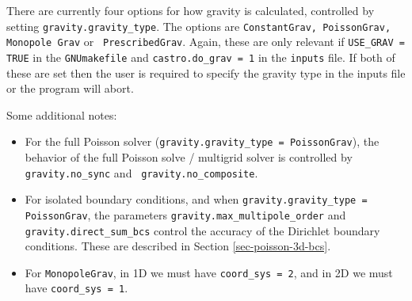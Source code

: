 There are currently four options for how gravity is calculated,
controlled by setting {\tt gravity.gravity\_type}.  The options are
{\tt ConstantGrav, PoissonGrav, Monopole Grav} or {\tt
  PrescribedGrav}.  Again, these are only relevant if {\tt USE\_GRAV =
  TRUE} in the {\tt GNUmakefile} and {\tt castro.do\_grav = 1} in the
{\tt inputs} file.  If both of these are set then the user is required
to specify the gravity type in the inputs file or the program will
abort.

Some additional notes:
\begin{itemize}

\item For the full Poisson solver ({\tt gravity.gravity\_type =
  PoissonGrav}), the behavior of the full Poisson solve / multigrid
solver is controlled by {\tt gravity.no\_sync} and {\tt
  gravity.no\_composite}.

\item For isolated boundary conditions, and when {\tt gravity.gravity\_type
  = PoissonGrav}, the parameters {\tt gravity.max\_multipole\_order}
and {\tt gravity.direct\_sum\_bcs} control the accuracy of the
Dirichlet boundary conditions.  These are described in Section
\ref{sec-poisson-3d-bcs}.

\item For {\tt MonopoleGrav}, in 1D we must have {\tt coord\_sys = 2}, and in
  2D we must have {\tt coord\_sys = 1}.
\end{itemize}

